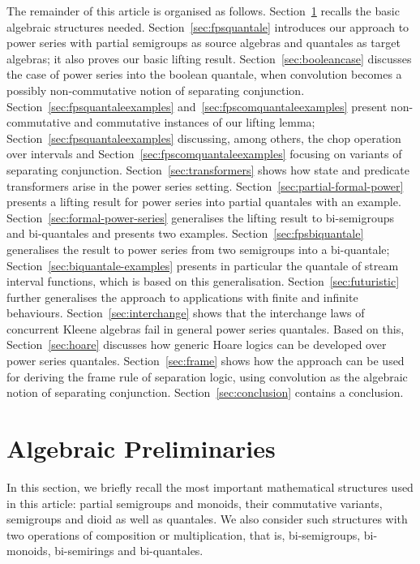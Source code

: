 \documentclass[12pt]{article}
\theoremstyle{definition}
\begin{document}
The remainder of this article is organised as
follows. Section~\ref{sec:algebr-prel} recalls the basic algebraic
structures needed. Section~\ref{sec:fpsquantale} introduces our
approach to power series with partial semigroups as source algebras
and quantales as target algebras; it also proves our basic lifting
result. Section~\ref{sec:booleancase} discusses the case of power
series into the boolean quantale, when convolution becomes a possibly
non-commutative notion of separating
conjunction. Section~\ref{sec:fpsquantaleexamples}
and~\ref{sec:fpscomquantaleexamples} present non-commutative and
commutative instances of our lifting lemma;
Section~\ref{sec:fpsquantaleexamples} discussing, among others, the
chop operation over intervals and
Section~\ref{sec:fpscomquantaleexamples} focusing on variants of
separating conjunction. Section~\ref{sec:transformers} shows how state
and predicate transformers arise in the power series setting.
Section~\ref{sec:partial-formal-power} presents a lifting result for
power series into partial quantales with an
example. Section~\ref{sec:formal-power-series} generalises the lifting
result to bi-semigroups and bi-quantales and presents two
examples. Section~\ref{sec:fpsbiquantale} generalises the result to
power series from two semigroups into a bi-quantale;
Section~\ref{sec:biquantale-examples} presents in particular the
quantale of stream interval functions, which is based on this
generalisation.  Section~\ref{sec:futuristic} further generalises the
approach to applications with finite and infinite
behaviours. Section~\ref{sec:interchange} shows that the interchange
laws of concurrent Kleene algebras fail in general power series
quantales. Based on this, Section~\ref{sec:hoare} discusses how
generic Hoare logics can be developed over power series
quantales. Section~\ref{sec:frame} shows how the approach can be used
for deriving the frame rule of separation logic, using convolution as
the algebraic notion of separating
conjunction. Section~\ref{sec:conclusion} contains a conclusion.



\section{Algebraic Preliminaries}
\label{sec:algebr-prel}

In this section, we briefly recall the most important mathematical
structures used in this article: partial semigroups and monoids, their
commutative variants, semigroups and dioid as well as quantales. We
also consider such structures with two operations of composition or
multiplication, that is, bi-semigroups, bi-monoids, bi-semirings and
bi-quantales.
\end{document}
